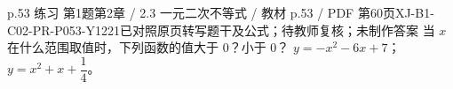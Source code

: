 \par\noindent\begin{minipage}{\linewidth}
\begin{bankitem}{p.53 练习 第1题}{第2章 / 2.3 一元二次不等式 / 教材 p.53 / PDF 第60页}{XJ-B1-C02-PR-P053-Y1221}{已对照原页转写题干及公式；待教师复核；未制作答案}
当 $x$ 在什么范围取值时，下列函数的值大于 0？小于 0？
$y=-x^2-6x+7$；
$y=x^2+x+\dfrac14$。
\end{bankitem}
\end{minipage}\par\medskip
